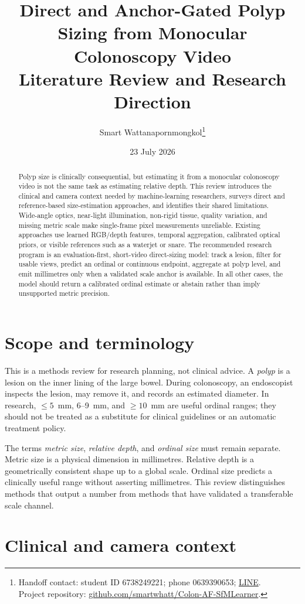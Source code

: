 \documentclass[11pt]{article}
\title{Direct and Anchor-Gated Polyp Sizing from Monocular Colonoscopy Video\\
\large Literature Review and Research Direction}
\author{Smart Wattanapornmongkol\thanks{\raggedright Handoff contact: student ID 6738249221; phone 0639390653; \href{https://line.me/ti/p/nqlvyY38hD}{LINE}.\\Project repository: \href{https://github.com/smartwhatt/Colon-AF-SfMLearner}{github.com/smartwhatt/Colon-AF-SfMLearner}.}}
\date{23 July 2026}
\begin{document}
\maketitle

\begin{abstract}
Polyp size is clinically consequential, but estimating it from a monocular
colonoscopy video is not the same task as estimating relative depth. This
review introduces the clinical and camera context needed by machine-learning
researchers, surveys direct and reference-based size-estimation approaches,
and identifies their shared limitations. Wide-angle optics, near-light
illumination, non-rigid tissue, quality variation, and missing metric scale
make single-frame pixel measurements unreliable. Existing approaches use
learned RGB/depth features, temporal aggregation, calibrated optical priors,
or visible references such as a waterjet or snare. The recommended research
program is an evaluation-first, short-video direct-sizing model: track a
lesion, filter for usable views, predict an ordinal or continuous endpoint,
aggregate at polyp level, and emit millimetres only when a validated scale
anchor is available. In all other cases, the model should return a calibrated
ordinal estimate or abstain rather than imply unsupported metric precision.
\end{abstract}

\section{Scope and terminology}

This is a methods review for research planning, not clinical advice. A
\emph{polyp} is a lesion on the inner lining of the large bowel. During
colonoscopy, an endoscopist inspects the lesion, may remove it, and records an
estimated diameter. In research, $\leq 5$~mm, 6--9~mm, and $\geq 10$~mm are
useful ordinal ranges; they should not be treated as a substitute for clinical
guidelines or an automatic treatment policy.

The terms \emph{metric size}, \emph{relative depth}, and \emph{ordinal size}
must remain separate. Metric size is a physical dimension in millimetres.
Relative depth is a geometrically consistent shape up to a global scale.
Ordinal size predicts a clinically useful range without asserting millimetres.
This review distinguishes methods that output a number from methods that have
validated a transferable scale channel.

\section{Clinical and camera context}
\end{document}
